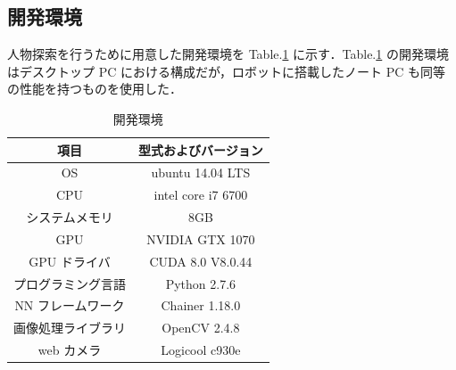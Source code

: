 \documentclass[twocolumn,10pt]{jarticle}
\begin{document}
\subsection{開発環境}
人物探索を行うために用意した開発環境を Table.\ref{tb:env} に示す．Table.\ref{tb:env} の開発環境はデスクトップ PC における構成だが，ロボットに搭載したノート PC も同等の性能を持つものを使用した．
\begin{table}[b]
 \begin{center}
  \caption{開発環境}
  \begin{tabular}{|c|c|} \hline
   項目 & 型式およびバージョン \\ \hline \hline
   OS & ubuntu 14.04 LTS \\ \hline
   CPU & intel core i7 6700 \\ \hline
   システムメモリ & 8GB \\ \hline
   GPU & NVIDIA GTX 1070 \\ \hline
   GPU ドライバ & CUDA 8.0 V8.0.44 \\ \hline
   プログラミング言語 & Python 2.7.6 \\ \hline
   NN フレームワーク & Chainer 1.18.0 \\ \hline
   画像処理ライブラリ & OpenCV 2.4.8 \\ \hline
   web カメラ & Logicool c930e \\ \hline
  \end{tabular}
  \label{tb:env}
 \end{center}
\end{table}
\end{document}
